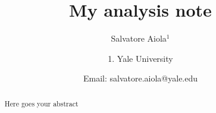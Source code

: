 \documentclass[ALICE,manyauthors]{ALICE_analysis_notes}
\begin{document}
%
%
%
\begin{titlepage}
%
\PHdate{\today}
%
\title{My analysis note}
%
\author{Salvatore Aiola$^{1}$}
\author{
1. Yale University\\
}
\author{Email: salvatore.aiola@yale.edu}
%
%
\begin{abstract}
Here goes your abstract
\end{abstract}
\end{titlepage}
%
\end{document}
